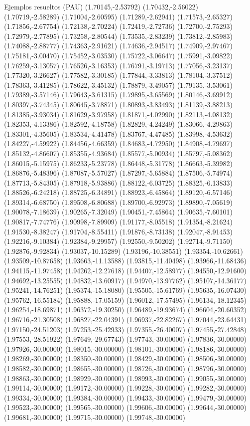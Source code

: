 \documentclass[11pt,a4paper]{article}
\begin{document}
\begin{fmex}{Ejemplos resueltos (PAU)}
(1.70145,-2.53792) (1.70432,-2.56022) (1.70719,-2.58289) (1.71004,-2.60595) (1.71289,-2.62941) (1.71573,-2.65327) (1.71856,-2.67754) (1.72138,-2.70224) (1.72419,-2.72736) (1.72700,-2.75293) (1.72979,-2.77895) (1.73258,-2.80544) (1.73535,-2.83239) (1.73812,-2.85983) (1.74088,-2.88777) (1.74363,-2.91621) (1.74636,-2.94517) (1.74909,-2.97467) (1.75181,-3.00470) (1.75452,-3.03530) (1.75722,-3.06647) (1.75991,-3.09822) (1.76259,-3.13057) (1.76526,-3.16353) (1.76791,-3.19713) (1.77056,-3.23137) (1.77320,-3.26627) (1.77582,-3.30185) (1.77844,-3.33813) (1.78104,-3.37512) (1.78363,-3.41285) (1.78622,-3.45132) (1.78879,-3.49057) (1.79135,-3.53061) (1.79389,-3.57146) (1.79643,-3.61315) (1.79895,-3.65569) (1.80146,-3.69912) (1.80397,-3.74345) (1.80645,-3.78871) (1.80893,-3.83493) (1.81139,-3.88213) (1.81385,-3.93034) (1.81629,-3.97958) (1.81871,-4.02990) (1.82113,-4.08132) (1.82353,-4.13386) (1.82592,-4.18758) (1.82829,-4.24249) (1.83066,-4.29863) (1.83301,-4.35605) (1.83534,-4.41478) (1.83767,-4.47485) (1.83998,-4.53632) (1.84227,-4.59922) (1.84456,-4.66359) (1.84683,-4.72950) (1.84908,-4.79697) (1.85132,-4.86607) (1.85355,-4.93684) (1.85577,-5.00934) (1.85797,-5.08362) (1.86015,-5.15975) (1.86233,-5.23778) (1.86448,-5.31778) (1.86663,-5.39982) (1.86876,-5.48396) (1.87087,-5.57027) (1.87297,-5.65884) (1.87506,-5.74974) (1.87713,-5.84305) (1.87918,-5.93886) (1.88122,-6.03725) (1.88325,-6.13833) (1.88526,-6.24218) (1.88725,-6.34891) (1.88923,-6.45864) (1.89120,-6.57146) (1.89314,-6.68750) (1.89508,-6.80688) (1.89700,-6.92973) (1.89890,-7.05619) (1.90078,-7.18639) (1.90265,-7.32049) (1.90451,-7.45864) (1.90635,-7.60101) (1.90817,-7.74776) (1.90998,-7.89909) (1.91177,-8.05518) (1.91354,-8.21624) (1.91530,-8.38247) (1.91704,-8.55411) (1.91876,-8.73138) (1.92047,-8.91453) (1.92216,-9.10384) (1.92384,-9.29957) (1.92550,-9.50202) (1.92714,-9.71150) (1.92876,-9.92834) (1.93037,-10.15289) (1.93196,-10.38551) (1.93354,-10.62661) (1.93509,-10.87658) (1.93663,-11.13588) (1.93815,-11.40498) (1.93966,-11.68436) (1.94115,-11.97458) (1.94262,-12.27618) (1.94407,-12.58977) (1.94550,-12.91600) (1.94692,-13.25555) (1.94832,-13.60917) (1.94970,-13.97762) (1.95107,-14.36177) (1.95241,-14.76251) (1.95374,-15.18080) (1.95505,-15.61769) (1.95635,-16.07430) (1.95762,-16.55184) (1.95888,-17.05159) (1.96012,-17.57495) (1.96134,-18.12345) (1.96254,-18.69871) (1.96372,-19.30250) (1.96489,-19.93674) (1.96604,-20.60352) (1.96716,-21.30508) (1.96827,-22.04391) (1.96937,-22.82267) (1.97044,-23.64431) (1.97150,-24.51203) (1.97253,-25.42933) (1.97355,-26.40007) (1.97455,-27.42848) (1.97553,-28.51922) (1.97649,-29.67743) (1.97743,-30.00000) (1.97836,-30.00000) (1.97926,-30.00000) (1.98015,-30.00000) (1.98101,-30.00000) (1.98186,-30.00000) (1.98269,-30.00000) (1.98350,-30.00000) (1.98429,-30.00000) (1.98506,-30.00000) (1.98582,-30.00000) (1.98655,-30.00000) (1.98726,-30.00000) (1.98796,-30.00000) (1.98863,-30.00000) (1.98929,-30.00000) (1.98993,-30.00000) (1.99055,-30.00000) (1.99114,-30.00000) (1.99172,-30.00000) (1.99228,-30.00000) (1.99282,-30.00000) (1.99334,-30.00000) (1.99384,-30.00000) (1.99433,-30.00000) (1.99479,-30.00000) (1.99523,-30.00000) (1.99565,-30.00000) (1.99606,-30.00000) (1.99644,-30.00000) (1.99681,-30.00000) (1.99715,-30.00000) (1.99748,-30.00000) 
\end{fmex}
\end{document}
